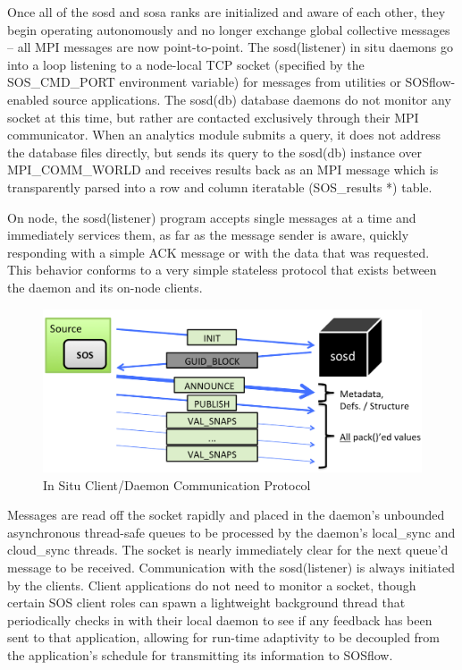 Once all of the sosd and sosa ranks are initialized and aware of each
other, they begin operating autonomously and no longer exchange global
collective messages -- all MPI messages are now point-to-point.
%
The sosd(listener) in situ daemons go into a loop listening to a
node-local TCP socket (specified by the SOS\_CMD\_PORT environment
variable) for messages from utilities or SOSflow-enabled source
applications.
%
The sosd(db) database daemons do not monitor any socket at this time,
but rather are contacted exclusively through their MPI communicator.
%
When an analytics module submits a query, it does not address the
database files directly, but sends its query to the sosd(db) instance
over MPI\_COMM\_WORLD and receives results back as an MPI message
which is transparently parsed into a row and column iteratable
(SOS\_results *) table.

On node, the sosd(listener) program accepts single messages at a time
and immediately services them, as far as the message sender is aware,
quickly responding with a simple ACK message or with the data that was
requested.  This behavior conforms to a very simple stateless protocol
that exists between the daemon and its on-node clients.

\begin{figure}[!t]
\centering
\includegraphics[width=5in]{images/sosd_protocol.png}
\caption{In Situ Client/Daemon Communication Protocol}
\label{fig_sim}
\end{figure}

Messages are read off the socket rapidly and placed in the daemon's
unbounded asynchronous thread-safe queues to be processed by the
daemon's local\_sync and cloud\_sync threads.
%
The socket is nearly immediately clear for the next queue'd message to
be received.
%
Communication with the sosd(listener) is always initiated by the
clients.
%
Client applications do not need to monitor a socket, though certain
SOS client roles can spawn a lightweight background thread that
periodically checks in with their local daemon to see if any feedback
has been sent to that application, allowing for run-time adaptivity to
be decoupled from the application's schedule for transmitting its
information to SOSflow.

